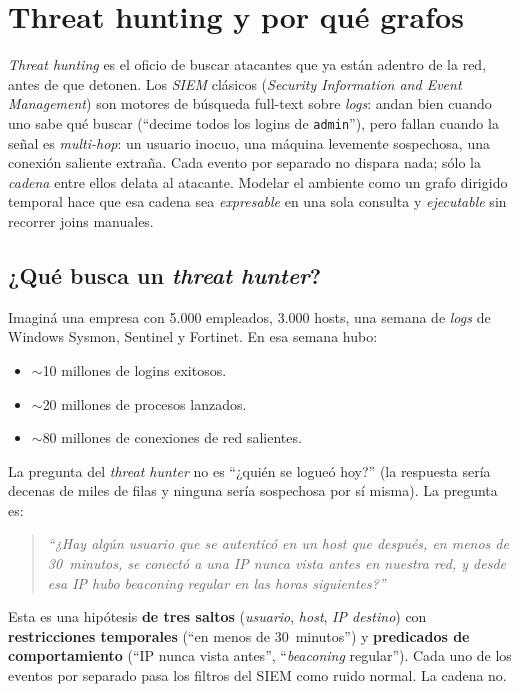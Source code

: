 \chapter{Threat hunting y por qué grafos}
\label{cap:threat-hunting}

\begin{intuicion}
\emph{Threat hunting} es el oficio de buscar atacantes que ya están
adentro de la red, antes de que detonen. Los \emph{SIEM} clásicos
(\emph{Security Information and Event Management}) son motores de
búsqueda full-text sobre \emph{logs}: andan bien cuando uno sabe qué
buscar (``decime todos los logins de \texttt{admin}''), pero fallan
cuando la señal es \emph{multi-hop}: un usuario inocuo, una máquina
levemente sospechosa, una conexión saliente extraña. Cada evento por
separado no dispara nada; sólo la \emph{cadena} entre ellos delata al
atacante. Modelar el ambiente como un grafo dirigido temporal hace
que esa cadena sea \emph{expresable} en una sola consulta y
\emph{ejecutable} sin recorrer joins manuales.
\end{intuicion}

\section{¿Qué busca un \emph{threat hunter}?}

Imaginá una empresa con 5.000 empleados, 3.000 hosts, una semana de
\emph{logs} de Windows Sysmon, Sentinel y Fortinet. En esa semana
hubo:

\begin{itemize}
    \item $\sim$10 millones de logins exitosos.
    \item $\sim$20 millones de procesos lanzados.
    \item $\sim$80 millones de conexiones de red salientes.
\end{itemize}

\noindent
La pregunta del \emph{threat hunter} no es ``¿quién se logueó hoy?''
(la respuesta sería decenas de miles de filas y ninguna sería
sospechosa por sí misma). La pregunta es:

\begin{quote}
\itshape
``¿Hay algún usuario que se autenticó en un host que después,
en menos de 30~minutos, se conectó a una IP nunca vista antes en
nuestra red, y desde esa IP hubo \emph{beaconing} regular en las
horas siguientes?''
\end{quote}

Esta es una hipótesis \textbf{de tres saltos} (\emph{usuario},
\emph{host}, \emph{IP destino}) con \textbf{restricciones temporales}
(``en menos de 30~minutos'') y \textbf{predicados de comportamiento}
(``IP nunca vista antes'', ``\emph{beaconing} regular''). Cada uno de
los eventos por separado pasa los filtros del SIEM como ruido normal.
La cadena no.

